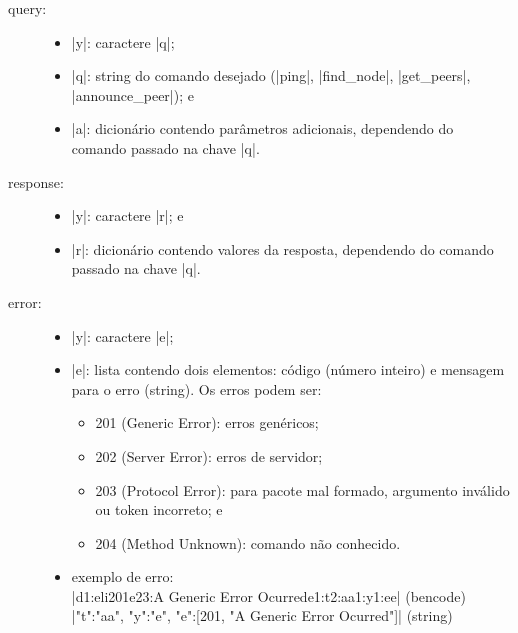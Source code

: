 \begin{description}
    \item[query:]
        \begin{itemize}
            \item \bverb|y|: caractere \sverb|q|;
            \item \bverb|q|: string do comando desejado (\sverb|ping|,
                \sverb|find_node|, \sverb|get_peers|, \sverb|announce_peer|); e
            \item \bverb|a|: dicionário contendo parâmetros adicionais, dependendo do
                comando passado na chave \bverb|q|.
        \end{itemize}

    \item[response:]
        \begin{itemize}
            \item \bverb|y|: caractere \sverb|r|; e
            \item \bverb|r|: dicionário contendo valores da resposta, dependendo do
                comando passado na chave \bverb|q|.
        \end{itemize}

    \newpage

    \item[error:]
        \begin{itemize}
            \item \bverb|y|: caractere \sverb|e|;

            \item \bverb|e|: lista contendo dois elementos: código (número inteiro) e
                mensagem para o erro (\gls*{string}). Os erros podem ser:
                \begin{itemize}
                    \item 201 (Generic Error): erros genéricos;
                    \item 202 (Server Error): erros de servidor;
                    \item 203 (Protocol Error): para pacote mal formado, argumento
                        inválido ou token incorreto; e
                    \item 204 (Method Unknown): comando não conhecido.
                \end{itemize}

            \item exemplo de erro: \\
                \bverb|d1:eli201e23:A Generic Error Ocurrede1:t2:aa1:y1:ee|
                (\gls*{bencode}) \\
                \sverb|{"t":"aa", "y":"e", "e":[201, "A Generic Error Ocurred"]}|
                (\gls*{string})
        \end{itemize}
\end{description}


